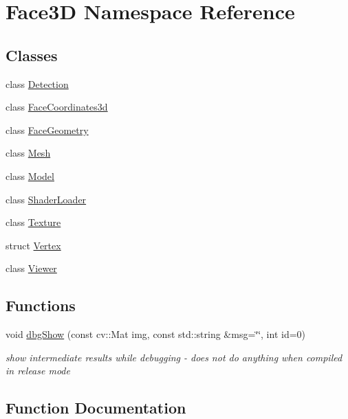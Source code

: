\hypertarget{namespace_face3_d}{}\section{Face3D Namespace Reference}
\label{namespace_face3_d}
\subsection*{Classes}
\begin{DoxyCompactItemize}
\item 
class \hyperlink{class_face3_d_1_1_detection}{Detection}
\item 
class \hyperlink{class_face3_d_1_1_face_coordinates3d}{Face\+Coordinates3d}
\item 
class \hyperlink{class_face3_d_1_1_face_geometry}{Face\+Geometry}
\item 
class \hyperlink{class_face3_d_1_1_mesh}{Mesh}
\item 
class \hyperlink{class_face3_d_1_1_model}{Model}
\item 
class \hyperlink{class_face3_d_1_1_shader_loader}{Shader\+Loader}
\item 
class \hyperlink{class_face3_d_1_1_texture}{Texture}
\item 
struct \hyperlink{struct_face3_d_1_1_vertex}{Vertex}
\item 
class \hyperlink{class_face3_d_1_1_viewer}{Viewer}
\end{DoxyCompactItemize}
\subsection*{Functions}
\begin{DoxyCompactItemize}
\item 
void \hyperlink{namespace_face3_d_a3b895408a6257eb9b7cfdbaec770e356}{dbg\+Show} (const cv\+::\+Mat img, const std\+::string \&msg=\char`\"{}\char`\"{}, int id=0)
\begin{DoxyCompactList}\small\item\em show intermediate results while debugging -\/ does not do anything when compiled in release mode \end{DoxyCompactList}\end{DoxyCompactItemize}


\subsection{Function Documentation}
